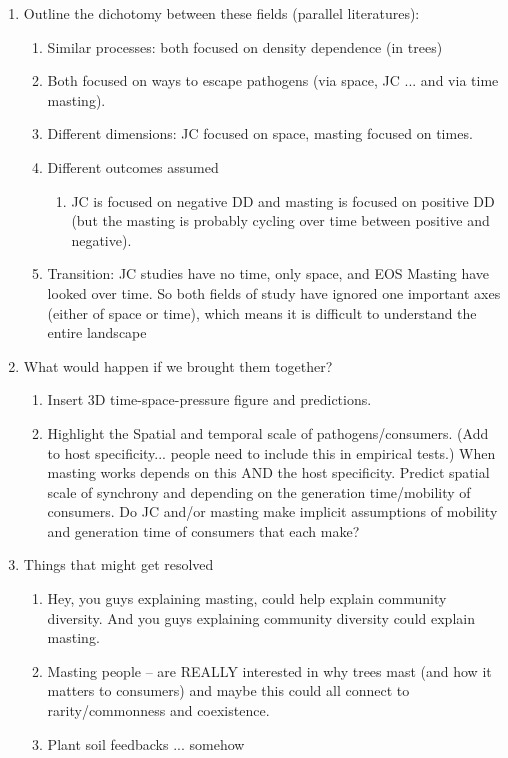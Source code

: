 \documentclass[11pt]{article}
\begin{document}
\begin{enumerate}
\item Outline the dichotomy between these fields (parallel literatures): 
\begin{enumerate}
\item Similar processes: both focused on density dependence (in trees)
\item Both focused on ways to escape pathogens (via space, JC ... and via time masting).
\item Different dimensions: JC focused on space, masting focused on times.
\item Different outcomes assumed
\begin{enumerate}
\item JC is focused on negative DD and masting is focused on positive DD (but the masting is probably cycling over time between positive and negative). 
\end{enumerate}
\item Transition: JC studies have no time, only space, and EOS Masting have looked over time. So both fields of study have ignored one important axes (either of space or time), which means it is difficult to understand the entire landscape
\end{enumerate}
\item What would happen if we brought them together? 
\begin{enumerate}
\item Insert 3D time-space-pressure figure and predictions. 
\item Highlight the Spatial and temporal scale of pathogens/consumers. (Add to host specificity... people need to include this in empirical tests.) When masting works depends on this AND the host specificity. Predict spatial scale of synchrony and depending on the generation time/mobility of consumers. Do JC and/or masting make implicit assumptions of mobility and generation time of consumers that each make? 
\end{enumerate}
\item Things that might get resolved
\begin{enumerate}
\item Hey, you guys explaining masting, could help explain community diversity. And you guys explaining community diversity could explain masting. 
\item Masting people -- are REALLY interested in why trees mast (and how it matters to consumers) and maybe this could all connect to rarity/commonness and coexistence. 
\item Plant soil feedbacks ... somehow

\end{enumerate}
\end{enumerate}
\end{document}
